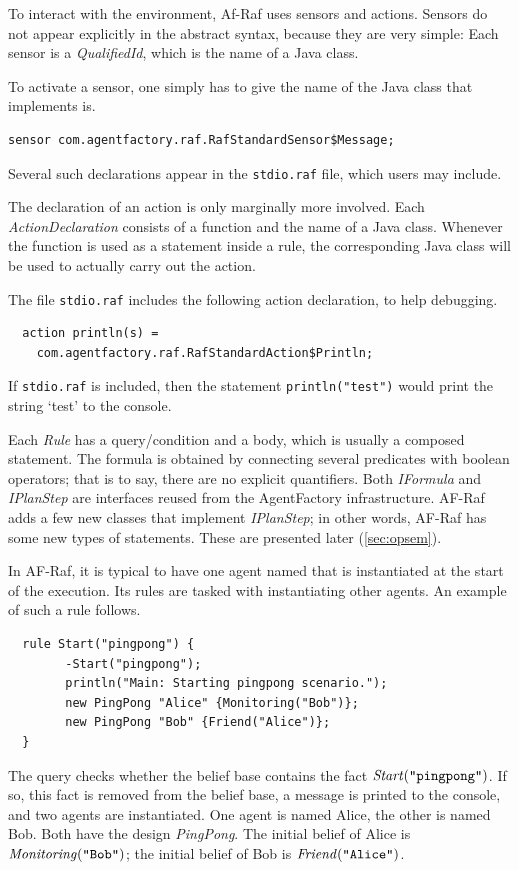 \documentclass[a4paper,12pt,oneside,fleqn]{book} %
\begin{document}
To interact with the environment, Af-Raf uses sensors and actions.
Sensors do not appear explicitly in the abstract syntax, because they
are very simple: Each sensor is a {\it QualifiedId}, which is the name of a
Java class.

\begin{example}
To activate a sensor, one simply has to give the name of the Java class
that implements is.
\begin{verbatim}
sensor com.agentfactory.raf.RafStandardSensor$Message;
\end{verbatim}
Several such declarations appear in the {\tt stdio.raf} file, which users
may include.
\end{example}

The declaration of an action is only marginally more involved.  Each
{\it ActionDeclaration\/} consists of a function and the name of a Java
class. Whenever the function is used as a statement inside a rule, the
corresponding Java class will be used to actually carry out the action.

\begin{example}
The file {\tt stdio.raf} includes the following action declaration, to help
debugging.
\begin{verbatim}
  action println(s) =
    com.agentfactory.raf.RafStandardAction$Println;
\end{verbatim}
If {\tt stdio.raf} is included, then the statement {\tt println("test")}
would print the string `test' to the console.
\end{example}

Each {\it Rule\/} has a query\slash condition and a body, which is usually
a composed statement. The formula is obtained by connecting several
predicates with boolean operators; that is to say, there are no explicit
quantifiers. Both {\it IFormula\/} and {\it IPlanStep\/} are interfaces
reused from the AgentFactory infrastructure. AF-Raf adds a few new classes
that implement {\it IPlanStep\/}; in other words, AF-Raf has some new
types of statements. These are presented later (\autoref{sec:opsem}).

\begin{example}
In AF-Raf, it is typical to have one agent named that is instantiated at
the start of the execution. Its rules are tasked with instantiating other
agents. An example of such a rule follows.
\begin{verbatim}
  rule Start("pingpong") {
        -Start("pingpong");
        println("Main: Starting pingpong scenario.");
        new PingPong "Alice" {Monitoring("Bob")};
        new PingPong "Bob" {Friend("Alice")};
  }
\end{verbatim}
The query checks whether the belief base contains the fact ${\it
Start}(\text{\tt``pingpong''})$. If so, this fact is removed from the
belief base, a message is printed to the console, and two agents are
instantiated. One agent is named Alice, the other is named Bob. Both have
the design {\it PingPong}. The initial belief of Alice is ${\it
Monitoring}(\text{\tt ``Bob''})$; the initial belief of Bob is ${\it
Friend}(\text{\tt``Alice''})$.
\end{example}
\end{document}
